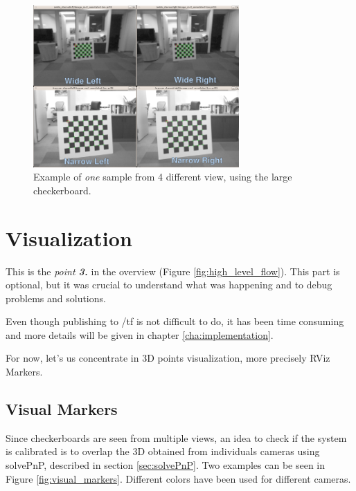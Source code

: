 \begin{figure}[!htbp]
 \centering
 \includegraphics[width=0.7\textwidth]{images/data_collection01.png}
 \caption{Example of \textit{one} sample from 4 different view, using the large checkerboard.}
 \label{fig:data_collection01}
\end{figure}




\section{Visualization}
\label{sec:visualization}

This is the \textit{point \textbf{3.}} in the overview (Figure \ref{fig:high_level_flow}). This part is optional, but it was crucial to understand what was happening and to debug problems and solutions.

Even though publishing to /tf is not difficult to do, it has been time consuming and more details will be given in chapter \ref{cha:implementation}. %

For now, let's us concentrate in 3D points visualization, more precisely RViz Markers.

\subsection{Visual Markers}
\label{sec:visual_markers}

Since checkerboards are seen from multiple views, an idea to check if the system is calibrated is to overlap the 3D obtained from individuals cameras using solvePnP, described in section \ref{sec:solvePnP}. Two examples can be seen in Figure \ref{fig:visual_markers}. Different colors have been used for different cameras.

